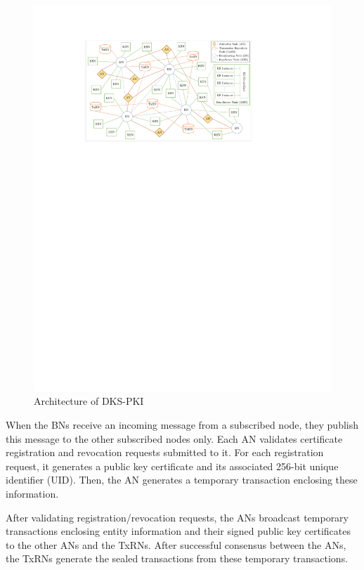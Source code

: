 \documentclass[lang=en]{sjtuarticle}
\begin{document}
\begin{figure}[h]
    \centering
    \includegraphics{DKS-PKI.pdf}
    \caption{Architecture of DKS-PKI}
    \label{fig:dks-pki}
\end{figure}

When the BNs receive an incoming message
from a subscribed node, they publish this message to the other subscribed
nodes only. Each AN validates certificate registration and revocation requests
submitted to it. For each registration request, it generates a public key certificate
and its associated 256-bit unique identifier (UID). Then, the AN generates
a temporary transaction enclosing these information.

After validating registration/revocation
requests, the ANs broadcast temporary transactions enclosing entity information
and their signed public key certificates to the other ANs and the TxRNs.
After successful consensus between the ANs, the TxRNs generate the sealed
transactions from these temporary transactions.
\end{document}
